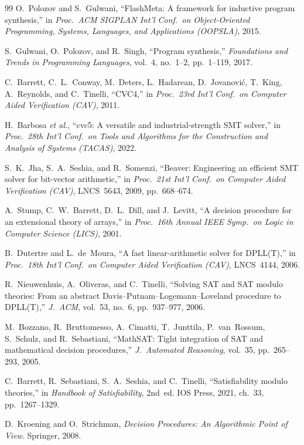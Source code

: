 \documentclass[journal,10pt]{IEEEtran}
\begin{document}
\begin{thebibliography}{99}
O.~Polozov and S.~Gulwani, ``FlashMeta: A framework for inductive
program synthesis,'' in \emph{Proc.\ ACM SIGPLAN Int'l Conf.\ on
Object-Oriented Programming, Systems, Languages, and Applications
(OOPSLA)}, 2015.

S.~Gulwani, O.~Polozov, and R.~Singh, ``Program synthesis,''
\emph{Foundations and Trends in Programming Languages}, vol.~4,
no.~1--2, pp.~1--119, 2017.

C.~Barrett, C.~L.~Conway, M.~Deters, L.~Hadarean, D.~Jovanovi{\'c},
T.~King, A.~Reynolds, and C.~Tinelli, ``CVC4,'' in \emph{Proc.\ 23rd
Int'l Conf.\ on Computer Aided Verification (CAV)}, 2011.

H.~Barbosa \emph{et al.}, ``cvc5: A versatile and industrial-strength
SMT solver,'' in \emph{Proc.\ 28th Int'l Conf.\ on Tools and Algorithms
for the Construction and Analysis of Systems (TACAS)}, 2022.

S.~K.~Jha, S.~A.~Seshia, and R.~Somenzi, ``Beaver: Engineering an
efficient SMT solver for bit-vector arithmetic,'' in \emph{Proc.\ 21st
Int'l Conf.\ on Computer Aided Verification (CAV)}, LNCS~5643, 2009,
pp.~668--674.

A.~Stump, C.~W.~Barrett, D.~L.~Dill, and J.~Levitt, ``A decision
procedure for an extensional theory of arrays,'' in \emph{Proc.\ 16th
Annual IEEE Symp.\ on Logic in Computer Science (LICS)}, 2001.

B.~Dutertre and L.~de~Moura, ``A fast linear-arithmetic solver for
DPLL(T),'' in \emph{Proc.\ 18th Int'l Conf.\ on Computer Aided
Verification (CAV)}, LNCS~4144, 2006.

R.~Nieuwenhuis, A.~Oliveras, and C.~Tinelli, ``Solving SAT and SAT
modulo theories: From an abstract Davis--Putnam--Logemann--Loveland
procedure to DPLL(T),'' \emph{J.\ ACM}, vol.~53, no.~6,
pp.~937--977, 2006.

M.~Bozzano, R.~Bruttomesso, A.~Cimatti, T.~Junttila, P.~van~Rossum,
S.~Schulz, and R.~Sebastiani, ``MathSAT: Tight integration of SAT and
mathematical decision procedures,'' \emph{J.\ Automated Reasoning},
vol.~35, pp.~265--293, 2005.

C.~Barrett, R.~Sebastiani, S.~A.~Seshia, and C.~Tinelli,
``Satisfiability modulo theories,'' in \emph{Handbook of
Satisfiability}, 2nd~ed. IOS Press, 2021, ch.~33, pp.~1267--1329.

D.~Kroening and O.~Strichman, \emph{Decision Procedures: An
Algorithmic Point of View}. Springer, 2008.


\end{thebibliography}
\end{document}
